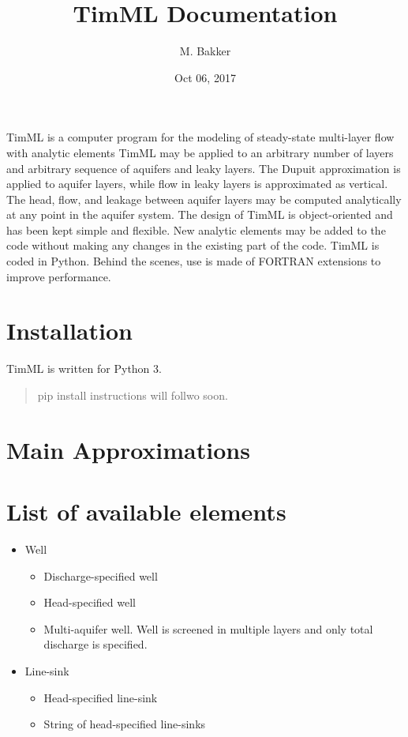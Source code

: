 \documentclass[letterpaper,10pt,english]{sphinxmanual}
\title{TimML Documentation}
\date{Oct 06, 2017}
\author{M. Bakker}
\begin{document}
\maketitle
\sphinxtableofcontents
{}\label{\detokenize{index::doc}}


TimML is a computer program for the modeling of steady-state multi-layer flow with analytic elements
TimML may be applied to an arbitrary number of layers and arbitrary sequence of aquifers and leaky layers.
The Dupuit approximation is applied to aquifer layers, while flow in leaky layers is approximated as vertical.
The head, flow, and leakage between aquifer layers may be computed analytically at any point in the aquifer system.
The design of TimML is object-oriented and has been kept simple and flexible.
New analytic elements may be added to the code without making any changes in the existing part of the code.
TimML is coded in Python. Behind the scenes, use is made of FORTRAN extensions to improve performance.


\chapter{Installation}
\label{\detokenize{index:installation}}\label{\detokenize{index:timml-this-documentation-is-under-construction}}
TimML is written for Python 3.
\begin{quote}

pip install instructions will follwo soon.
\end{quote}


\chapter{Main Approximations}
\label{\detokenize{index:main-approximations}}

\chapter{List of available elements}
\label{\detokenize{index:list-of-available-elements}}\begin{itemize}
\item {} 
Well
\begin{itemize}
\item {} 
Discharge-specified well

\item {} 
Head-specified well

\item {} 
Multi-aquifer well. Well is screened in multiple layers and only total discharge is specified.

\end{itemize}

\item {} 
Line-sink
\begin{itemize}
\item {} 
Head-specified line-sink

\item {} 
String of head-specified line-sinks

\end{itemize}

\end{itemize}
\end{document}
